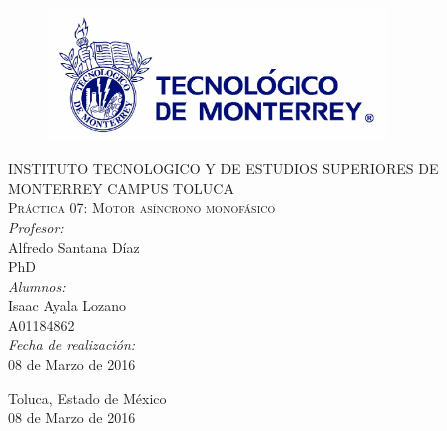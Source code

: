 \begin{titlepage}
\begin{center}
\begin{figure}[!htbp]
\centering
\includegraphics[width=90mm]{./img/logo_itesm.jpg}
\end{figure}


\textsc{ INSTITUTO TECNOLOGICO Y DE ESTUDIOS SUPERIORES DE MONTERREY
CAMPUS TOLUCA}\\[1.5cm]

\textsc{ Pr\'actica 07: Motor as\'incrono monof\'asico}\\[0.5cm]


\emph{Profesor:}\\
 Alfredo Santana D\'iaz\\
 PhD\\
 \medskip
\emph{Alumnos:} \\
Isaac Ayala Lozano\\A01184862\\
 \medskip
\emph{Fecha de realizaci\'on:}\\
08 de Marzo de 2016\\
\vfill


{\large
Toluca, Estado de M\'exico\\
08 de Marzo de 2016
}

\end{center}
\end{titlepage}
